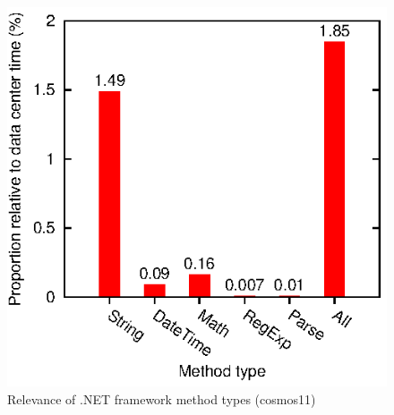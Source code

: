\begin{figure}[ht]
\includegraphics{graphs/methodTypes}
\caption{Relevance of .NET framework method types (cosmos11)}
\label{fig:methodTypes}
\end{figure}








